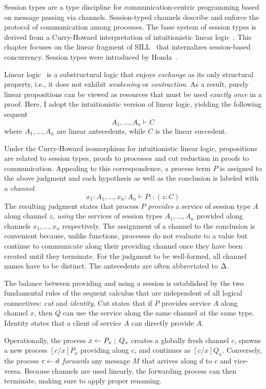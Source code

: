 Session types are a type discipline for communication-centric programming
based on message passing via channels. Session-typed channels describe and
enforce the protocol of communication among processes. The base system of
session types is derived from a Curry-Howard interpretation of intuitionistic
linear logic~\cite{CairesCONCUR2010}. This chapter focuses on the linear
fragment of SILL~\cite{PfenningFOSSACS2015} that internalizes session-based
concurrency.
Session types were introduced by Honda~\cite{HondaCONCUR1993}.


Linear logic~\cite{GirardTCS1987} is a substructural logic that enjoys
\emph{exchange} as its only structural property, i.e., it does not exhibit
\emph{weakening} or \emph{contraction}. As a result, purely linear
propositions can be viewed as resources that must be used \emph{exactly
once} in a proof. Here, I adopt the intuitionistic version of linear logic,
yielding the following sequent
\[
A_1, \ldots, A_n \vdash C
\]
where $A_1, \ldots, A_n$ are linear antecedents, while $C$ is the linear
succedent.

Under the Curry-Howard isomorphism for intuitionistic linear logic,
propositions are related to session types, proofs to processes and cut
reduction in proofs to communication. Appealing to this correspondence,
a process term $P$ is assigned to the above judgment and each hypothesis
as well as the conclusion is labeled with a \emph{channel}:
\[
x_1 : A_1, \ldots, x_n : A_n \vdash P :: (z : C)
\]
The resulting judgment states that process $P$ \emph{provides} a service
of session type $A$ along channel $z$, \emph{using} the services of session
types $A_1, \ldots, A_n$ provided along channels $x_1, \ldots, x_n$
respectively. The assignment of a channel to the conclusion is convenient
because, unlike functions, processes do not evaluate to a value but continue
to communicate along their providing channel once they have been created
until they terminate. For the judgment to be well-formed, all channel names
have to be distinct. The antecedents are often abbreviated to $\Delta$.

The balance between providing and using a session is established by the
two fundamental rules of the sequent calculus that are independent of all
logical connectives: \emph{cut} and \emph{identity}. Cut states that if
$P$ provides service $A$ along channel $x$, then $Q$ can use the service
along the same channel at the same type. Identity states that a client of
service $A$ can directly provide $A$.
Operationally, the process $x \leftarrow P_x \; ; \; Q_x$ creates a globally fresh
channel $c$, spawns a new process $[c/x]P_x$ providing along $c$, and
continues as $[c/x]Q_x$. Conversely, the process $c \leftarrow d$
\emph{forwards} any message $M$ that arrives along $d$ to $c$ and
vice-versa. Because channels are used linearly, the forwarding process
can then terminate, making sure to apply proper renaming.

